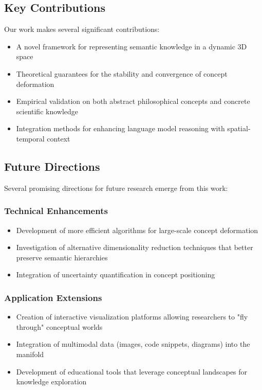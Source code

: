 \documentclass{article}
\begin{document}
\subsection{Key Contributions}
Our work makes several significant contributions:
\begin{itemize}
    \item A novel framework for representing semantic knowledge in a dynamic 3D space
    \item Theoretical guarantees for the stability and convergence of concept deformation
    \item Empirical validation on both abstract philosophical concepts and concrete scientific knowledge
    \item Integration methods for enhancing language model reasoning with spatial-temporal context
\end{itemize}

\subsection{Future Directions}
Several promising directions for future research emerge from this work:

\subsubsection{Technical Enhancements}
\begin{itemize}
    \item Development of more efficient algorithms for large-scale concept deformation
    \item Investigation of alternative dimensionality reduction techniques that better preserve semantic hierarchies
    \item Integration of uncertainty quantification in concept positioning
\end{itemize}

\subsubsection{Application Extensions}
\begin{itemize}
    \item Creation of interactive visualization platforms allowing researchers to "fly through" conceptual worlds
    \item Integration of multimodal data (images, code snippets, diagrams) into the manifold
    \item Development of educational tools that leverage conceptual landscapes for knowledge exploration
\end{itemize}
\end{document}
